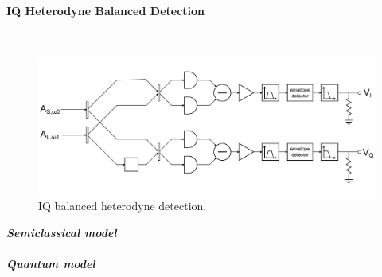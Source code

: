 \begin{bibunit}[plain]
\paragraph{IQ Heterodyne Balanced Detection}\ \\
%
\begin{figure}[H]
	\centering
	\includegraphics[width=15cm]{./sdf/optical_detection/figures/detection-IQ-balanced-heterodyne.pdf}
	\caption{IQ balanced heterodyne detection.}
\end{figure}
%
\noindent
{\bf \em Semiclassical model}\\
\\
{\bf \em Quantum model}\\



\end{bibunit}
